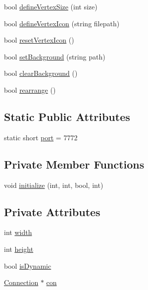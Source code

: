 \begin{DoxyCompactItemize}
bool \hyperlink{classGraphViewer_ac4b2a9fec74d38e64088aa79ca4b7d9b}{define\+Vertex\+Size} (int size)
\item 
bool \hyperlink{classGraphViewer_af1adb6a361457187a820e01dcf0a34b7}{define\+Vertex\+Icon} (string filepath)
\item 
bool \hyperlink{classGraphViewer_ae2b602cfdfb49ec0a67f2bcd11b0fbdb}{reset\+Vertex\+Icon} ()
\item 
bool \hyperlink{classGraphViewer_a02437b5fecd8b90de24436068312d593}{set\+Background} (string path)
\item 
bool \hyperlink{classGraphViewer_a5a03467a98312f2fef5b337677b104a8}{clear\+Background} ()
\item 
bool \hyperlink{classGraphViewer_a3009a66958686ccb7e78b68e37c3c423}{rearrange} ()
\end{DoxyCompactItemize}
\subsection*{Static Public Attributes}
\begin{DoxyCompactItemize}
\item 
static short \hyperlink{classGraphViewer_a89d0abe75f41feededc49497cc514342}{port} = 7772
\end{DoxyCompactItemize}
\subsection*{Private Member Functions}
\begin{DoxyCompactItemize}
\item 
void \hyperlink{classGraphViewer_a1ce9dff4903c650d3b2d33a3ef1d1f61}{initialize} (int, int, bool, int)
\end{DoxyCompactItemize}
\subsection*{Private Attributes}
\begin{DoxyCompactItemize}
\item 
int \hyperlink{classGraphViewer_a5de27a1d20968b8494cd4bf5a4eb27e1}{width}
\item 
int \hyperlink{classGraphViewer_a9a1000e492a66ac4301c7135275690da}{height}
\item 
bool \hyperlink{classGraphViewer_a9d9947154bc63354c6d02a0680aad952}{is\+Dynamic}
\item 
\hyperlink{classConnection}{Connection} $\ast$ \hyperlink{classGraphViewer_a14a206f78c242e739e0908b06070ba4d}{con}
\end{DoxyCompactItemize}



